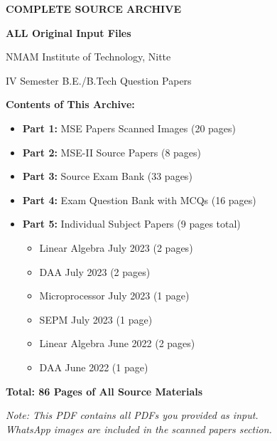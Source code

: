 \documentclass[11pt,a4paper]{article}
\begin{document}
\begin{titlepage}
\centering
\vspace*{2cm}
{\Huge\bfseries COMPLETE SOURCE ARCHIVE\par}
\vspace{1cm}
{\Large\bfseries ALL Original Input Files\par}
\vspace{2cm}
{\Large NMAM Institute of Technology, Nitte\par}
\vspace{0.5cm}
{\large IV Semester B.E./B.Tech Question Papers\par}
\vspace{3cm}

{\Large\bfseries Contents of This Archive:\par}
\vspace{1cm}

\begin{itemize}
\item \textbf{Part 1:} MSE Papers Scanned Images (20 pages)
\item \textbf{Part 2:} MSE-II Source Papers (8 pages)
\item \textbf{Part 3:} Source Exam Bank (33 pages)
\item \textbf{Part 4:} Exam Question Bank with MCQs (16 pages)
\item \textbf{Part 5:} Individual Subject Papers (9 pages total)
  \begin{itemize}
  \item Linear Algebra July 2023 (2 pages)
  \item DAA July 2023 (2 pages)
  \item Microprocessor July 2023 (1 page)
  \item SEPM July 2023 (1 page)
  \item Linear Algebra June 2022 (2 pages)
  \item DAA June 2022 (1 page)
  \end{itemize}
\end{itemize}

\vspace{2cm}
{\large\textbf{Total: 86 Pages of All Source Materials}\par}
\vspace{0.5cm}
{\large\textit{Note: This PDF contains all PDFs you provided as input.\\
WhatsApp images are included in the scanned papers section.}\par}

\vfill
\end{titlepage}
\end{document}

